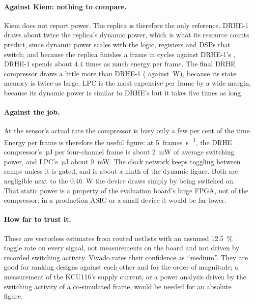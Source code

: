 \paragraph{Against Kiem: nothing to compare.} Kiem does not report power. The
replica is therefore the only reference. DRHE-1 draws about twice the replica's
dynamic power, which is what its resource counts predict, since dynamic power
scales with the logic, registers and DSPs that switch; and because the replica
finishes a frame in  cycles against DRHE-1's
, DRHE-1 spends about 4.4 times as much energy per frame.
The final DRHE compressor draws a little more than DRHE-1 (
against \,W), because its state memory is twice as large.
LPC is the most expensive per frame by a wide margin, because its dynamic power
is similar to DRHE's but it takes five times as long.

\paragraph{Against the job.} At the sensor's actual rate the compressor is busy
only a few per cent of the time. Energy per frame is therefore the useful
figure: at \SI{5}{frames\per\second}, the DRHE compressor's
\,\si{\micro\joule} per four-channel frame is about
\SI{2}{\milli\watt} of average switching power, and LPC's
\,\si{\micro\joule} about \SI{9}{\milli\watt}. The clock
network keeps toggling between ramps unless it is gated, and is about a ninth
of the dynamic figure. Both are negligible next to the \SI{0.46}{\watt} the
device draws simply by being switched on. That static power is a property of the
evaluation board's large FPGA, not of the compressor; in a production ASIC or a
small device it would be far lower.

\paragraph{How far to trust it.} These are vectorless estimates from routed
netlists with an assumed \SI{12.5}{\percent} toggle rate on every signal, not
measurements on the board and not driven by recorded switching activity. Vivado
rates their confidence as ``medium''. They are good for ranking designs against
each other and for the order of magnitude; a measurement of the KCU116's supply
current, or a power analysis driven by the switching activity of a co-simulated
frame, would be needed for an absolute figure.

